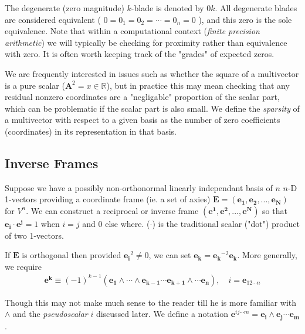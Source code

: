 \documentclass[a4paper]{book}
\numberwithin{equation}{chapter}
\begin{document}
The degenerate (zero magnitude) $k$-blade is denoted by $0k$.
All degenerate blades are considered equivalent ( $0 = 0_1 = 0_2 = \cdots = 0_n = 0$ ), 
and this zero is the sole equivalence. 
Note that within a computational context (\emph{finite precision arithmetic}) we will 
typically be checking for proximity rather than equivalence with zero. It is often worth keeping 
track of the "grades" of expected zeros.

 \vspace{\baselineskip}
 
We are frequently interested in issues such as whether the square of a 
multivector is a pure scalar ($\mathbf{A}^2 = x\in \mathbb{R}$), 
but in practice this may mean checking that any residual nonzero coordinates are a "negligable" 
proportion of the scalar part, which can be problematic if the scalar part is also small.
We define the \emph{sparsity} of a multivector with respect to a given basis as the number of zero 
coefficients (coordinates) in its representation in that basis. 

    \subsection{Inverse Frames}

Suppose we have a possibly non-orthonormal linearly independant basis of $n$ $n$-D 1-vectors providing 
a coordinate frame (ie. a set of axies) $\mathbf{E=(e_1,e_2,...,e_N)}$ for 
$V^n$. We can construct a reciprocal or inverse frame $\mathbf{(e^1,e^2,...,e^N)}$ 
so that $\mathbf{e_i\cdot e^j} = 1$ when $i=j$ and 0 else where. 
($\cdot$) is the traditional scalar ("dot") product of two 1-vectors.

 \vspace{\baselineskip}
 
If $\mathbf{E}$ is orthogonal then provided $\mathbf{e_i}^2\ne0$, 
we can set $\mathbf{e_k} = \mathbf{e_k}^{-2}\mathbf{e_k}$. More generally, 
we require 
\begin{align*}
    \mathbf{e^k} \equiv (-1)^{k-1}(\mathbf{e_1\wedge \cdots \wedge e_{k-1} \cdots e_{k+1} \wedge
    \cdots e_n}), \quad i=\mathbf{e}_{12\cdots n}
\end{align*}

Though this may not make much sense to the reader till he is more familiar 
with $\wedge$ and the \emph{pseudoscalar} $i$ discussed later.
We define a notation $\mathbf{e}^{ij\cdots m} = \mathbf{e_i \wedge e_j \cdots e_m}$.

 \vspace{\baselineskip}
 
\end{document}

